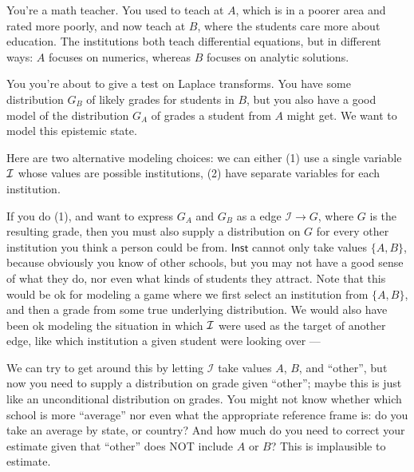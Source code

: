 \documentclass{article}
\newcommand{\Ed}{\mathcal E}
\numberwithin{equation}{section}
\begin{document}
\begin{notfocus}
\begin{vfull}
	\begin{example} \label{ex:teacher}
		You're a math teacher. You used to teach at $A$, which is in a poorer area and rated more poorly, and now teach at $B$, where the students care more about education. The institutions both teach differential equations, but in different ways: $A$ focuses on numerics, whereas $B$ focuses on analytic solutions.
		
		You you're about to give a test on Laplace transforms.
		You have some distribution $G_B$ of likely grades for students in $B$, but you also have a good model of the distribution $G_A$ of grades a student from $A$ might get. We want to model this epistemic state.

		Here are two alternative modeling choices: we can either (1) use a single variable $\cal I$ whose values are possible institutions, (2) have separate variables for each institution.
		
		\begin{center}
		\end{center}
		
		If you do (1), and want to express $G_A$ and $G_B$ as a edge $\mathcal  I \to G$, where $G$ is the resulting grade, then you must also supply a distribution on $G$ for every other institution you think a person could be from. $\mathsf {Inst}$ cannot only take values $\{A,B\} $, because obviously you know of other schools, but you may not have a good sense of what they do, nor even what kinds of students they attract. 
			Note that this would be ok for modeling a game where we first select an institution from $\{A, B\}$, and then a grade from some true underlying distribution. We would also have been ok modeling the situation in which $\cal I$ were used as the target of another edge, like which institution a given student were looking over --- 
		
		We can try to get around this by letting $\mathcal  I$
                take values $A$, $B$, and ``other'', but now you need
                to supply a distribution on grade given ``other'';
                maybe this is just like an unconditional distribution
                on grades. You might not know whether which school is
                more ``average'' nor even what the appropriate
                reference frame is: do you take an average by state,
                or country? And how much do you need to correct your
                estimate given that ``other'' does NOT include $A$ or
                $B$? This is implausible to estimate. 		 
	

\end{example}
\end{vfull}
\end{notfocus}
\end{document}
